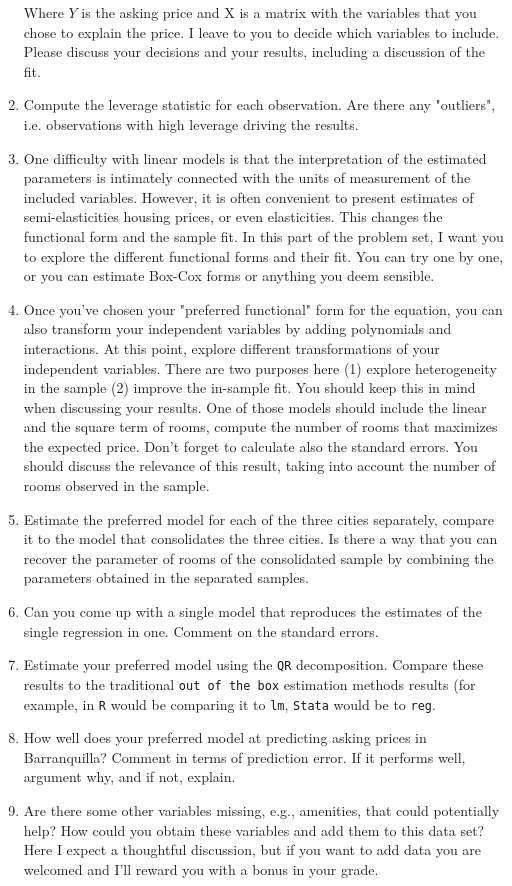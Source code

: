 \documentclass[12pt,onecolumn]{article}
\begin{document}
\begin{enumerate}
  Where $Y$ is the asking price and X  is a matrix with the variables that you chose to explain the price. I leave to you to decide which variables to include. Please discuss your decisions and your results, including a discussion of the fit.
  \item Compute the leverage statistic for each observation. Are there any "outliers", i.e. observations with high leverage driving the results.
  \item One difficulty with linear models is that the interpretation of the estimated parameters is intimately connected with the units of measurement of the included variables. However,  it is often convenient to present estimates of semi-elasticities housing prices, or even elasticities. This changes the functional form and the sample fit. In this part of the problem set, I want you to explore the different functional forms and their fit. You can try one by one, or you can estimate Box-Cox forms or anything you deem sensible.
  \item Once you've chosen your "preferred functional" form for the equation, you can also transform your independent variables by adding polynomials and interactions. At this point, explore different transformations of your independent variables. There are two purposes here (1) explore heterogeneity in the sample (2) improve the in-sample fit. You should keep this in mind when discussing your results. One of those models should include the linear and the square term of rooms, compute the number of rooms that maximizes the expected price. Don't forget to calculate also the standard errors. You should discuss the relevance of this result, taking into account the number of rooms observed in the sample.
  \item Estimate the preferred model for each of the three cities separately, compare it to the model that consolidates the three cities. Is there a way that you can recover the parameter of rooms of the consolidated sample by   combining  the parameters obtained in the separated samples. 
  \item Can you come up with a single model that reproduces the  estimates of the single regression in one. Comment on the standard errors.
  \item Estimate your preferred model using the \texttt{QR} decomposition. Compare these results to the traditional \texttt{out of the box} estimation methods results (for example, in \texttt{R} would be comparing it to \texttt{lm}, \texttt{Stata} would be to \texttt{reg}.

\item How well does your preferred model at predicting asking prices in Barranquilla? Comment in terms of prediction error. If it performs well, argument why, and if not, explain.

\item Are there some other variables missing, e.g., amenities, that could potentially help? How could you obtain these variables and add them to this data set? Here I expect a thoughtful discussion, but if you want to add data you are welcomed and I'll reward you with a bonus in your grade. 

  
\end{enumerate}
\end{document}
